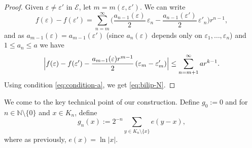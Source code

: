 \documentclass[JEP,XML,SOM,Unicode,published]{cedram}
\let\backslash\setminus
\let\sm\setminus
\numberwithin{equation}{section}
\theoremstyle{plain}
\theoremstyle{definition}
\let\sm\setminus
\newcommand{\cE}{{\mathcal E}}
\begin{document}
\begin{proof}
Given $\varepsilon \neq \varepsilon'$ in $\cE$, let $m=m(\varepsilon,\varepsilon')$. We can write
\[
f(\varepsilon)-f(\varepsilon') = \sum_{n=m}^\infty \Big (\dfrac{a_{n-1}(\varepsilon)}{2}\, \varepsilon_n - \dfrac{a_{n-1}(\varepsilon')}{2}\, \varepsilon'_n \Big) r^{n-1},
\]
and as $a_{m-1} (\varepsilon)= a_{m-1}( \varepsilon')$ (since $a_n(\varepsilon)$ depends only on
$\varepsilon_1, \dotsc, \varepsilon_n$) and $1\le a_n \le a$ we have
\[
\Bigl |f(\varepsilon)-f(\varepsilon') - \dfrac{a_{m-1}(\varepsilon)r^{m-1}}{2}\, (\varepsilon_m -\varepsilon'_m)\Bigr| \le \sum_{n=m+1}^\infty a r^{k-1}.
\]
Using condition \eqref{eq:condition-a}, we get \eqref{eq:bilip-N}.
\end{proof}

We come to the key technical point of our construction.
Define $g_0 :=0$ and for $n \in \mathbb{N}\sm\{0\}$ and $x\in K_n$, define
\begin{equation}\label{eq:defg}
g_n(x):= 2^{-n} \sum_{y\in K_n\backslash \{x\}} e(y-x),
\end{equation}
where as previously, $e(x) = \ln |x|$.
\end{document}
